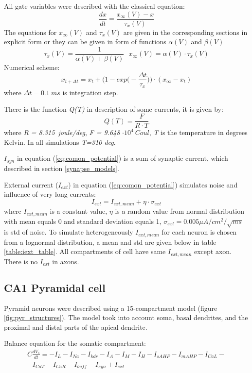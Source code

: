 \documentclass[a4paper,12pt]{article}
\begin{document}
All gate variables were described with the classical equation: 
\begin{equation}
\frac{dx}{dt} = \frac{x_{\infty}(V) - x}{\tau_x(V)}
\end{equation}
The equations for $x_{\infty}(V)$ and $\tau_x(V)$ are given in the corresponding sections in explicit form or they can be given in form of functions  $\alpha(V)$ and $\beta(V)$
\begin{equation}
\tau_x(V) =  \frac{1}{\alpha(V) + \beta(V)} \ \ \ 
x_{\infty}(V) = \alpha(V) \cdot \tau_x(V)
\end{equation}
Numerical scheme:
\begin{equation}
x_{t + \Delta t} = x_t+\Big(1 - exp \Big(-\frac{\Delta t}{\tau_x} \Big) \Big)\cdot (x_{\infty}-x_t) 
\end{equation}
where $\Delta t = 0.1\ ms$ is integration step.

There is the function \textit{Q(T)} in description of some currents, it is given by:
\begin{equation}
\label{eq:QT}
Q(T)= \frac{F}{ R \cdot T }
\end{equation}
where \textit{R = 8.315\ joule/deg}, \textit{F = 9.648} $\cdot 10^4 \ Coul$,
\textit{T} is the temperature in degrees Kelvin. In all simulations \textit{T=310 deg}.


$I_{syn}$ in equation (\ref{eq:comon_potential}) is a sum of synaptic current, which described in section \ref{synapse_models}. 

External current ($I_{ext}$) in equation (\ref{eq:comon_potential}) simulates noise and influence of very long currents:
\begin{equation}
I_{ext} = I_{ext, mean} + \eta \cdot \sigma_{ext}
\end{equation}
where $I_{ext, mean}$ is a constant value,  $ \eta$ is a random value from normal distribution with mean equals 0 and standard deviation equals 1, $\sigma_{ext}=0.005 \mu A/cm^2/\sqrt{ms}$ is std of noise. To simulate heterogeneously $I_{ext, mean}$ for each neuron is chosen from a lognormal distribution, a mean and std are given below in table \ref{table:iext_table}. All compartments of cell have same $I_{ext, mean}$ except axon. There is no $I_{ext}$ in axons.

\subsection{CA1 Pyramidal cell}
Pyramid neurons were described using a 15-compartment model (figure \ref{fig:pyr_structures}). The model took into account soma, basal dendrites, and the proximal and distal parts of the apical dendrite. \par
Balance equation for the somatic compartment:
\begin{eqnarray}
C\frac{dV_s}{dt}=-I_L-I_{Na}-I_{kdr}-I_A-I_M-I_H-I_{sAHP}-I_{mAHP}-I_{CaL}- \nonumber \\ -I_{CaT}-I_{CaR}-I_{buff}-I_{syn} + I_{ext}
\end{eqnarray}
\end{document}
